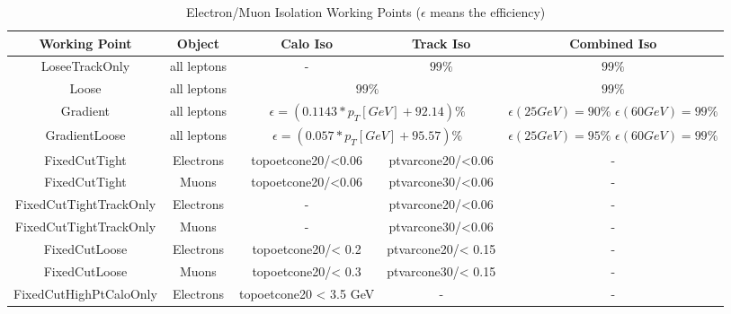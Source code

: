\begin{table}[h]
	\caption{Electron/Muon Isolation Working Points ($\epsilon$ means the efficiency)}
	\renewcommand{\arraystretch}{1.5}
	\centering
	\begin{adjustbox}{center}
		\begin{tabular}{|c | c | c | c | c |}
			\hline
			\hline
			{\bf Working Point} &{\bf Object} &{\bf Calo Iso}                   &{\bf Track Iso}  &{Combined Iso} \\
			\hline
			LoseeTrackOnly      &all leptons  &-                                      &$99\%$                 &$99\%$               \\
			\hline
			Loose               &all leptons  &\multicolumn{2}{|c|}{$99\%$}                                   &$99\%$               \\
			\hline
			Gradient            &all leptons  &\multicolumn{2}{|c|}{$\epsilon=(0.1143*p_{T}[GeV]+92.14)\%$}   & \shortstack{\footnotesize{$\epsilon(25GeV)=90\%$} \\  \footnotesize{$\epsilon(60GeV)=99\%$}}\\       
			\hline
			GradientLoose       &all leptons  &\multicolumn{2}{|c|}{$\epsilon=(0.057*p_{T}[GeV]+95.57)\%$}   & \shortstack{\footnotesize{$\epsilon(25GeV)=95\%$} \\  \footnotesize{$\epsilon(60GeV)=99\%$}}\\
			\hline
			FixedCutTight       &Electrons  &\footnotesize{topoetcone20/\pT<0.06}                 &\footnotesize{ptvarcone20/\pT<0.06}  &-               \\
			\hline
			FixedCutTight       &Muons  &\footnotesize{topoetcone20/\pT<0.06}                 &\footnotesize{ptvarcone30/\pT<0.06}  &-               \\
			\hline
			\footnotesize{FixedCutTightTrackOnly}      &Electrons     &-                 &\footnotesize{ptvarcone20/\pT<0.06}  &-               \\
			\hline
			\footnotesize{FixedCutTightTrackOnly}      &Muons      &-                 & \footnotesize{ptvarcone30/\pT<0.06}  &-               \\
			\hline
			FixedCutLoose        &Electrons  & \footnotesize{topoetcone20/\pT < 0.2} & \footnotesize{ptvarcone20/\pT < 0.15}  & - \\
			\hline
			FixedCutLoose        &Muons  & \footnotesize{topoetcone20/\pT < 0.3} & \footnotesize{ptvarcone30/\pT< 0.15}  & - \\
			\hline
			\footnotesize{FixedCutHighPtCaloOnly} & Electrons &  \footnotesize{topoetcone20} < 3.5 GeV & - &-\\
			\hline
		\end{tabular}
	\end{adjustbox}
	\label{Tab:iso}
\end{table}
